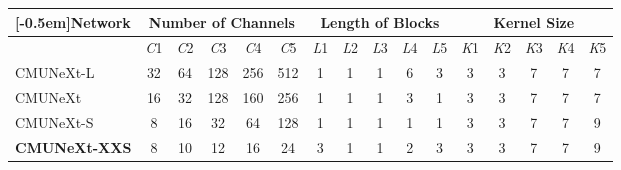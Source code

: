 \begin{tabular}{>{\centering\arraybackslash}m{2.5cm}|ccccc|ccccc|ccccc}

\toprule[1.1pt]

\multirow{2}{*}[-0.5em]{Network} & \multicolumn{5}{c|}{Number of Channels} & \multicolumn{5}{c|}{Length of Blocks} & \multicolumn{5}{c}{Kernel Size}\\
\cmidrule{2-16}

\multicolumn{1}{c|}{}  & \textit{C}1 &  \textit{C}2 & \textit{C}3 & \textit{C}4 & \textit{C}5 & \textit{L}1 &  \textit{L}2 & \textit{L}3 & \textit{L}4 & \textit{L}5 & \textit{K}1 &  \textit{K}2 & \textit{K}3 & \textit{K}4 & \textit{K}5 \\

\midrule[0.7pt]

CMUNeXt-L 
& 32 &  64 & 128 & 256 & 512 
& 1 &  1 & 1 & 6 & 3 
& 3 &  3 & 7 & 7 & 7 \\

CMUNeXt 
& 16 & 32 & 128 & 160 & 256 
& 1 &  1 & 1 & 3 & 1 
& 3 &  3 & 7 & 7 & 7 \\

CMUNeXt-S  
& 8 & 16 & 32 & 64 & 128 
& 1 & 1 & 1 & 1 & 1 
& 3 & 3 & 7 & 7 & 9 \\

\midrule[0.7pt]

\textbf{CMUNeXt-XXS}
& 8 & 10 & 12 & 16 & 24 
& 3 & 1 & 1 & 2 & 3 
& 3 &  3 & 7 & 7 & 9 \\

\bottomrule[1.1pt]
\end{tabular}
